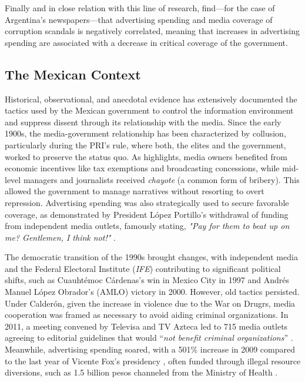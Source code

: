 Finally and in close relation with this line of research, \cite{ArgCorr-DiTella-AEJAE} find—for the case of Argentina's newspapers—that advertising spending and media coverage of corruption scandals is negatively correlated, meaning that increases in advertising spending are associated with a decrease in critical coverage of the government. 

\subsection{The Mexican Context}

Historical, observational, and anecdotal evidence has extensively documented the tactics used by the Mexican government to control the information environment and suppress dissent through its relationship with the media. Since the early 1900s, the media-government relationship has been characterized by collusion, particularly during the PRI’s rule, where both, the elites and the government, worked to preserve the status quo. As \cite{FourthState-Lawson-Book} highlights, media owners benefited from economic incentives like tax exemptions and broadcasting concessions, while mid-level managers and journalists received \textit{chayote} (a common form of bribery). This allowed the government to manage narratives without resorting to overt repression. Advertising spending was also strategically used to secure favorable coverage, as demonstrated by President López Portillo's withdrawal of funding from independent media outlets, famously stating, \textit{"Pay for them to beat up on me? Gentlemen, I think not!"} \citep{PrensaVendida-Rod}.

The democratic transition of the 1990s brought changes, with independent media and the Federal Electoral Institute (\textit{IFE}) contributing to significant political shifts, such as Cuauhtémoc Cárdenas’s win in Mexico City in 1997 and Andrés Manuel López Obrador's (AMLO) victory in 2000. However, old tactics persisted. Under Calderón, given the increase in violence due to the War on Drugrs, media cooperation was framed as necessary to avoid aiding criminal organizations. In 2011, a meeting convened by Televisa and TV Azteca led to 715 media outlets agreeing to editorial guidelines that would “\textit{not benefit criminal organizations}” \citep{Callaron-Jornada, Callaron-Proceso}. Meanwhile, advertising spending soared, with a 501\% increase in 2009 compared to the last year of Vicente Fox's presidency \citep{Fundar}, often funded through illegal resource diversions, such as 1.5 billion pesos channeled from the Ministry of Health \citep{Contralinea-Desvio}.

